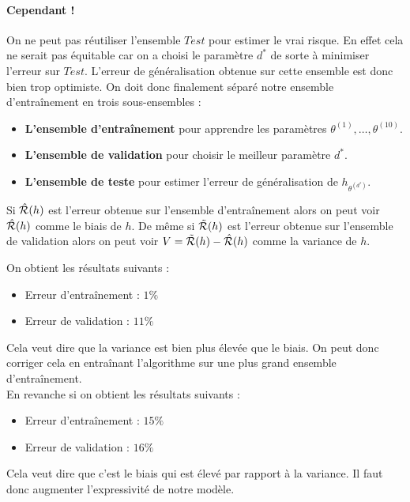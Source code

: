 \paragraph{Cependant !} On ne peut pas réutiliser l'ensemble $Test$ pour estimer le vrai risque. En effet cela ne serait pas équitable car on a choisi le paramètre $d^*$ de sorte à minimiser l'erreur sur $Test$. L'erreur de généralisation obtenue sur cette ensemble est donc bien trop optimiste.	On doit donc finalement séparé notre ensemble d'entraînement en trois sous-ensembles :
\begin{itemize}
	\item \textbf{L'ensemble d'entraînement} pour apprendre les paramètres $\theta^{(1)}, \dots, \theta^{(10)}$.
	\item \textbf{L'ensemble de validation} pour choisir le meilleur paramètre $d^*$.
	\item \textbf{L'ensemble de teste} pour estimer l'erreur de généralisation de $h_{\theta^{(d^*)}}$.
\end{itemize}
Si $\hat{\mathcal{R}}(h)$ est l'erreur obtenue sur l'ensemble d'entraînement alors on peut voir $\hat{\mathcal{R}}(h)$ comme le biais de $h$. De même si $\tilde{\mathcal{R}}(h)$ est l'erreur obtenue sur l'ensemble de validation alors on peut voir $V = \tilde{\mathcal{R}}(h) - \hat{\mathcal{R}}(h)$ comme la variance de $h$.

\exe
On obtient les résultats suivants :
\begin{itemize}
	\item Erreur d'entraînement : $1\%$
	\item Erreur de validation : $11\%$
\end{itemize}
Cela veut dire que la variance est bien plus élevée que le biais. On peut donc corriger cela en entraînant l'algorithme sur une plus grand ensemble d'entraînement. \\
En revanche si on obtient les résultats suivants :
\begin{itemize}
	\item Erreur d'entraînement : $15\%$
	\item Erreur de validation : $16\%$
\end{itemize}
Cela veut dire que c'est le biais qui est élevé par rapport à la variance. Il faut donc augmenter l'expressivité de notre modèle.